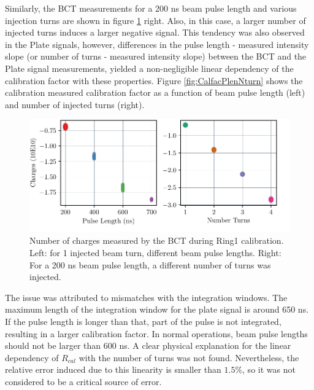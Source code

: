 Similarly, the BCT measurements for a 200 ns beam pulse length and various injection turns are shown in figure \ref{fig:PulseLenghtNturns} right. Also, in this case, a larger number of injected turns induces a larger negative signal. This tendency was also observed in the Plate signals, however, differences in the pulse length - measured intensity slope (or number of turns - measured intensity slope) between the BCT and the Plate signal measurements, yielded a non-negligible linear dependency of the calibration factor with these properties. Figure \ref{fig:CalfacPlenNturn} shows the calibration measured calibration factor as a function of beam pulse length (left) and number of injected turns (right).

\begin{figure}[h]
    \centering
    \includegraphics[width=1.0\columnwidth]{Figure_BCT_PulseLength/BCT_TurnPulse.pdf}
    \caption{Number of charges measured by the BCT during Ring1 calibration. Left: for 1 injected beam turn, different beam pulse lengths. Right: For a 200 ns beam pulse length, a different number of turns was injected.}
    \label{fig:PulseLenghtNturns}
\end{figure}

The issue was attributed to mismatches with the integration windows. The maximum length of the integration window for the plate signal is around 650 ns. If the pulse length is longer than that, part of the pulse is not integrated, resulting in a larger calibration factor. In normal operations, beam pulse lengths should not be larger than 600 ns. A clear physical explanation for the linear dependency of $R_{cal}$ with the number of turns was not found. Nevertheless, the relative error induced due to this linearity is smaller than $1.5 \%$, so it was not considered to be a critical source of error. 

